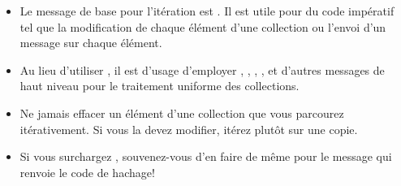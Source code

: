 \documentclass[a4paper,10pt,twoside]{book}
\begin{document}
\begin{itemize}
  \item Le message de base pour l'it\'eration est . Il est 
utile pour du code imp\'eratif tel que la modification de chaque \'el\'ement d'une collection ou l'envoi d'un message sur chaque \'el\'ement.
  \item Au lieu d'utiliser , il est d'usage d'employer , , , ,  et d'autres messages de haut niveau pour le traitement uniforme des collections.
  \item Ne jamais effacer un \'el\'ement d'une collection que vous parcourez it\'erativement. Si vous la devez modifier, it\'erez plut\^ot sur une copie.
  \item Si vous surchargez \ct{=}, souvenez-vous d'en faire de m\^eme pour le message  
qui renvoie le code de hachage!
\end{itemize}

\ifx\wholebook\relax\else
   
   
\end{document}
